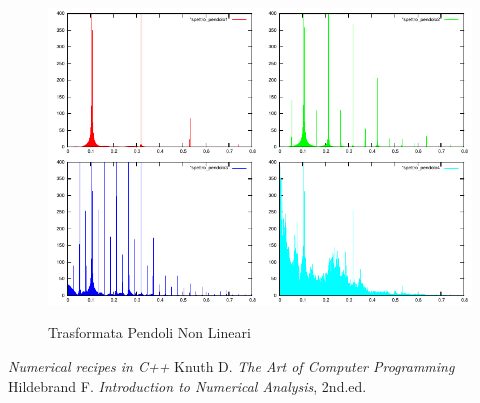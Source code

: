 \documentclass[13pt]{article}
\begin{document}
\begin{figure}
\caption{Trasformata Pendoli Non Lineari}
\includegraphics[width=24cm,keepaspectratio]{picture/quadro}
\centering
\label{fig:quadro}
\end{figure}



\clearpage
\begin{thebibliography}{99}
\emph{Numerical recipes in C++}
Knuth D. \emph{The Art of Computer Programming}
Hildebrand F. \emph{Introduction to Numerical Analysis}, 2nd.ed.
\end{thebibliography}
\end{document}
